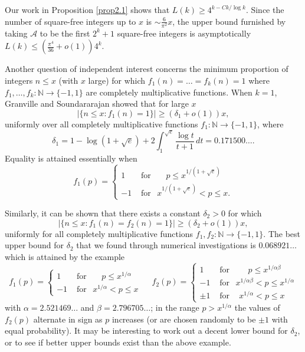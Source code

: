 \documentclass[11pt,makeidx, reqno]{amsart}
\theoremstyle{mystyle}
\theoremstyle{definition}
\begin{document}
Our work in Proposition \ref{prop2.1} shows that $L(k) \ge 4^{k-Ck/\log k}$.    Since the number of square-free integers up to $x$ is $\sim \frac{6}{\pi^2} x$, the upper bound furnished by taking ${\mathcal A}$ to be the first $2^k+1$ square-free integers is asymptotically  $L(k) \le (\frac{\pi^4}{36}+o(1)) 4^k$.     
 


 

\par Another question of independent interest concerns the minimum proportion of integers $n\le x$ (with $x$ large) for which $f_1(n) = \dots = f_k(n) = 1$ where $f_1, \dots, f_k: \mathbb{N} \to \{ -1, 1 \}$ are completely multiplicative functions. When $k = 1$, Granville and Soundararajan \cite{granvilleSpectrum} showed that for large $x$ 
\[
| \{ n\le x: f_1(n)=1\} | \ge (\delta_1+o(1))x,
\]
uniformly over all completely multiplicative functions $f_1:\mathbb{N}\to \{-1, 1\}$, 
where 
\[
\delta_1 = 1 - \log(1 + \sqrt{e}) + 2 \int_1^{\sqrt{e}} \frac{\log t}{t+1}\,dt = 0.171500\dots .
\]
Equality is attained essentially when 
\[f_1(p) = \begin{cases}
    1 & \text{ for }\hspace{18pt}p \le x^{1/(1+\sqrt{e})} \\
    -1 & \text{ for }\hspace{5pt}x^{1/(1+\sqrt{e})} < p \le x.
\end{cases}\]


\par Similarly, it can be shown that there exists a constant $\delta_2 > 0$ for which
\[
|\{n \le x: f_1(n)=f_2(n)=1\}|  \ge (\delta_2+o(1))x, 
\]
uniformly for all completely multiplicative functions $f_1, f_2: \mathbb{N} \to \{ -1, 1\}$. The best upper bound for $\delta_2$ that we found through numerical investigations is $0.068921\dots$ which is attained by the example 
\[
f_1(p) = \begin{cases}
    1 & \text{ for }\hspace{18pt}p \le x^{1/\alpha} \\
    -1 & \text{ for }\hspace{5pt}x^{1/\alpha} < p \le x
\end{cases} \hspace{15pt} f_2(p) = \begin{cases}
    1 & \text{ for }\hspace{23pt}p \le x^{1/\alpha\beta} \\
    -1 & \text{ for }\hspace{5pt}x^{1/\alpha\beta} < p \le x^{1/\alpha} \\ 
    \pm 1 &\text{ for } \hspace{10pt}x^{1/\alpha} < p \le x
\end{cases}\]
with $\alpha = 2.521469\dots$ and $\beta = 2.796705\dots$; in the range $p>x^{1/\alpha}$ the values of $f_2(p)$ alternate in sign as $p$ increases (or are chosen randomly to be $\pm 1$ with equal probability).  It may be interesting to work out a decent lower bound for $\delta_2$, or to see if better upper bounds exist than the above example. 
\end{document}
